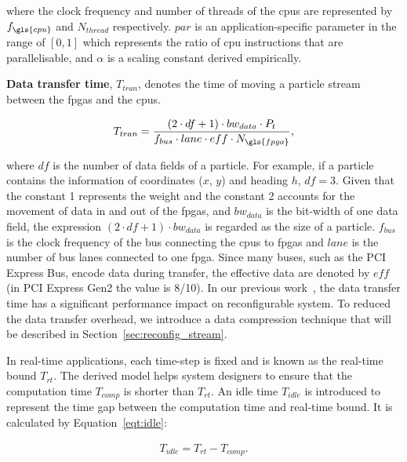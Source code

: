 where the clock frequency and number of threads of the \glspl{cpu} are represented by $f_{\gls{cpu}}$ and $N_{thread}$ respectively.
$par$ is an application-specific parameter in the range of $[0,1]$ which represents the ratio of \gls{cpu} instructions that are parallelisable, and $\alpha$ is a scaling constant derived empirically.

\textbf{Data transfer time}, $T_{tran}$, denotes the time of moving a particle stream between the \glspl{fpga} and the \glspl{cpu}.

\begin{equation}
\begin{aligned}
T_{tran} = \frac{(2 \cdot df + 1) \cdot bw_{data} \cdot P_t}{f_{bus} \cdot lane \cdot eff \cdot N_{\gls{fpga}}} \mbox{,}
\end{aligned}
\label{eqt:data}
\end{equation}

where $df$ is the number of data fields of a particle.
For example, if a particle contains the information of coordinates ($x$, $y$) and heading $h$, $df=3$.
Given that the constant 1 represents the weight and the constant 2 accounts for the movement of data in and out of the \glspl{fpga},
and $bw_{data}$ is the bit-width of one data field, the expression $(2 \cdot df + 1) \cdot bw_{data}$ is regarded as the size of a particle.
$f_{bus}$ is the clock frequency of the bus connecting the \glspl{cpu} to \glspl{fpga} and $lane$ is the number of bus lanes connected to one \gls{fpga}.
Since many buses, such as the PCI Express Bus, encode data during transfer, the effective data are denoted by $eff$ (in PCI Express Gen2 the value is 8/10).
In our previous work~\cite{chau13arc}, the data transfer time has a significant performance impact on reconfigurable system.
To reduced the data transfer overhead, we introduce a data compression technique that will be described in Section~\ref{sec:reconfig_stream}.

In real-time applications, each time-step is fixed and is known as the real-time bound $T_{rt}$.
The derived model helps system designers to ensure that the computation time $T_{comp}$ is shorter than $T_{rt}$.
An idle time $T_{idle}$ is introduced to represent the time gap between the computation time and real-time bound.
It is calculated by Equation~\ref{eqt:idle}:

\begin{equation}
\begin{aligned}
T_{idle} = T_{rt} - T_{comp} \mbox{.}
\end{aligned}
\label{eqt:idle}
\end{equation}

